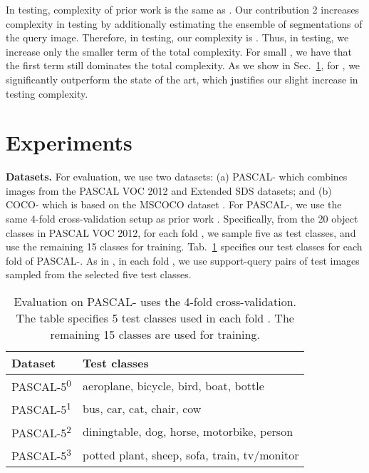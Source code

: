 \documentclass[10pt,twocolumn,letterpaper]{article}
\begin{document}
In testing, complexity of prior work \cite{zhang2018sgone,rakelly2018conditional,rakelly2018fewshot} is the same as . Our contribution 2 increases complexity in testing by additionally estimating the ensemble of  segmentations of the query image. Therefore, in testing, our complexity is  . Thus, in testing, we increase only the smaller term of the total complexity. For small , we have that the first term  still dominates the total complexity. As we show in  
Sec.~\ref{sec:experiments}, for , we significantly outperform the state of the art, which justifies our slight increase in testing complexity.


\section{Experiments} \label{sec:experiments}
{\bf Datasets.} For evaluation, we use two datasets: (a) PASCAL- which combines images from the PASCAL VOC 2012 \cite{Everingham10} and Extended SDS  \cite{hariharan2011semantic} datasets; and (b) COCO- which is based on the MSCOCO dataset \cite{lin2014microsoft}. For PASCAL-, we use the same 4-fold cross-validation setup as prior work  \cite{shaban2017one,rakelly2018conditional,dong2018few}. Specifically, from the 20 object classes in PASCAL VOC 2012, for each fold , we sample five as test classes, and use the remaining 15 classes for training. Tab.~\ref{tab:voc} specifies our test classes for each fold of PASCAL-. As in \cite{shaban2017one}, in each fold , we use  support-query pairs of test images sampled from the selected five test classes.  


\begin{table}
  \centering
  \begin{footnotesize}
  \begin{tabular}{l|l}
    \hline
    \hline
    \textbf{Dataset} & \textbf{Test classes} \\
    \hline
    PASCAL-5\textsuperscript{0} & aeroplane, bicycle, bird, boat, bottle \\
PASCAL-5\textsuperscript{1} & bus, car, cat, chair, cow \\
PASCAL-5\textsuperscript{2} & diningtable, dog, horse, motorbike, person \\
PASCAL-5\textsuperscript{3} & potted plant, sheep, sofa, train, tv/monitor \\
    \hline
    \hline
  \end{tabular}
  \caption{Evaluation on PASCAL- uses the 4-fold cross-validation. The table specifies 5
  test classes used in each fold . The remaining 15 classes are used for training.}\label{tab:voc}
  \vspace{-13pt}
  \end{footnotesize}
\end{table}
\end{document}

